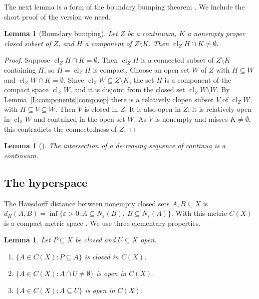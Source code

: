 \documentclass[11pt,reqno]{amsart}
\theoremstyle{plain}
\newtheorem{lemma}[theorem]{Lemma}
\theoremstyle{definition}
\theoremstyle{remark}
\newcommand{\cl}{\operatorname{cl}}
\begin{document}
The next lemma is a form of the boundary bumping theorem \cite[Theorems~5.4 and~5.6]{Nadler}. We include the short proof of the version we need.

\begin{lemma}[Boundary bumping]\label{L:bumping}
Let $Z$ be a continuum, $K$ a nonempty proper closed subset of $Z$, and $H$ a component of $Z\setminus K$. Then $\cl_Z H\cap K\neq\emptyset$.
\end{lemma}

\begin{proof}
Suppose $\cl_ZH\cap K=\emptyset$. Then $\cl_ZH$ is a connected subset of $Z\setminus K$ containing $H$, so $H=\cl_ZH$ is compact. Choose an open set $W$ of $Z$ with $H\subseteq W$ and $\cl_ZW\cap K=\emptyset$. Since $\cl_ZW\subseteq Z\setminus K$, the set $H$ is a component of the compact space $\cl_ZW$, and it is disjoint from the closed set $\cl_ZW\setminus W$. By Lemma~\ref{L:components}\ref{comp:sep} there is a relatively clopen subset $V$ of $\cl_ZW$ with $H\subseteq V\subseteq W$. Then $V$ is closed in $Z$. It is also open in $Z$: it is relatively open in $\cl_Z W$ and contained in the open set $W$. As $V$ is nonempty and misses $K\neq\emptyset$, this contradicts the connectedness of $Z$.
\end{proof}

\begin{lemma}[{\cite[Theorem~1.8]{Nadler}}]\label{L:nested}
The intersection of a decreasing sequence of continua is a continuum.
\end{lemma}

\subsection{The hyperspace}
The Hausdorff distance between nonempty closed sets $A,B\subseteq X$ is $d_H(A,B)=\inf\{\varepsilon>0: A\subseteq N_\varepsilon(B),\ B\subseteq N_\varepsilon(A)\}$. With this metric $C(X)$ is a compact metric space \cite{IN}. We use three elementary properties.

\begin{lemma}\label{L:vietoris}
Let $P\subseteq X$ be closed and $U\subseteq X$ open.
\begin{enumerate}[label=\textup{(\alph*)}]
\item\label{v:contains} $\{A\in C(X):P\subseteq A\}$ is closed in $C(X)$.
\item\label{v:meets} $\{A\in C(X):A\cap U\neq\emptyset\}$ is open in $C(X)$.
\item\label{v:inside} $\{A\in C(X):A\subseteq U\}$ is open in $C(X)$.
\end{enumerate}
\end{lemma}
\end{document}
